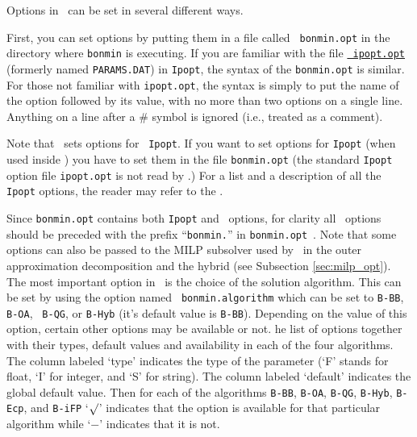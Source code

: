 
\begin{PageSummary}
\end{PageSummary}


Options in \Bonmin\ can be set in several different ways.

First, you can set options by putting them in a file called {\tt
bonmin.opt} in the directory where {\tt bonmin} is executing. If you
are familiar with the file
\href{\IpoptDoc{50}}{\tt
ipopt.opt} (formerly named {\tt PARAMS.DAT}) in {\tt Ipopt}, the
syntax of the {\tt bonmin.opt} is similar. For those not familiar
with {\tt ipopt.opt}, the syntax is simply to put the name of the
option followed by its value, with no more than two options on a
single line. Anything on a line after a \# symbol is ignored (i.e.,
treated as a comment).

Note that \Bonmin\ sets options for {\tt
Ipopt}. If you want to set options for {\tt Ipopt} (when used inside \Bonmin) you have to set them
in the file {\tt bonmin.opt} (the standard {\tt Ipopt} option file {\tt ipopt.opt}
is not read by \Bonmin.)
For a list and a description of all the {\tt Ipopt} options, the
reader may refer to the
.

Since {\tt bonmin.opt} contains both {\tt Ipopt} and \Bonmin\ options, for clarity
all \Bonmin\ options should be preceded with the prefix ``{\tt bonmin.}'' in {\tt bonmin.opt}~.
Note that some options can also be passed to the MILP subsolver used by \Bonmin\
in the outer approximation decomposition
and the hybrid (see Subsection \ref{sec:milp_opt}).\\

The most important option in \Bonmin\ is the choice of the solution
algorithm. This can be set by using the option named {\tt
bonmin.algorithm} which can be set to {\tt B-BB}, {\tt B-OA}, {\tt
B-QG}, or {\tt B-Hyb} (it's default value is {\tt B-BB}). Depending
on the value of this option, certain other options may be available
or not. \latexhtml{Table \ref{tab:options} gives t}{T}he list of options together
with their types, default values and availability in each of the
four algorithms. The column labeled `type' indicates the type of the
parameter (`F' stands for float, `I' for integer, and `S' for
string). The column labeled `default' indicates the global default
value. Then for each of the algorithms {\tt B-BB}, {\tt B-OA},
{\tt B-QG}, {\tt B-Hyb}, {\tt B-Ecp}, and {\tt B-iFP} `$\surd$' indicates that the option is
available for that particular algorithm
while `$-$' indicates that it is not.\\

